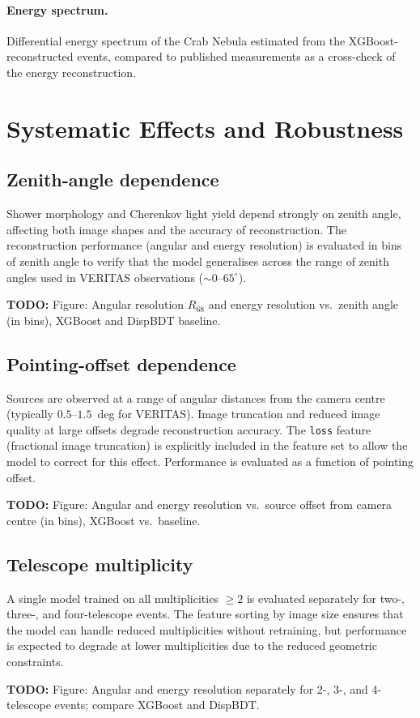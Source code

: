 \documentclass[12pt]{article}
\newcommand{\todo}[1]{\begin{hintBox} \textbf{TODO:} #1 \end{hintBox}}
\begin{document}
\paragraph{Energy spectrum.}
Differential energy spectrum of the Crab Nebula estimated from the
XGBoost-reconstructed events, compared to published measurements
\citep{2015ICRC...34..792A} as a cross-check of the energy reconstruction.

\section{Systematic Effects and Robustness}
\label{sec:systematics}

\subsection{Zenith-angle dependence}

Shower morphology and Cherenkov light yield depend strongly on zenith angle,
affecting both image shapes and the accuracy of reconstruction.
The reconstruction performance (angular and energy resolution) is evaluated
in bins of zenith angle to verify that the model generalises across the
range of zenith angles used in VERITAS observations ($\sim 0$--$65^\circ$).
\todo{Figure: Angular resolution $R_{68}$ and energy resolution vs.\ zenith angle (in bins), XGBoost and DispBDT baseline.}

\subsection{Pointing-offset dependence}

Sources are observed at a range of angular distances from the camera centre
(typically $0.5$--$1.5$~deg for VERITAS).
Image truncation and reduced image quality at large offsets degrade reconstruction
accuracy. The \texttt{loss} feature (fractional image truncation) is explicitly
included in the feature set to allow the model to correct for this effect.
Performance is evaluated as a function of pointing offset.
\todo{Figure: Angular and energy resolution vs.\ source offset from camera centre (in bins), XGBoost vs.\ baseline.}

\subsection{Telescope multiplicity}

A single model trained on all multiplicities $\geq 2$ is evaluated separately
for two-, three-, and four-telescope events.
The feature sorting by image size ensures that the model can handle reduced
multiplicities without retraining, but performance is expected to degrade
at lower multiplicities due to the reduced geometric constraints.
\todo{Figure: Angular and energy resolution separately for 2-, 3-, and 4-telescope events; compare XGBoost and DispBDT.}
\end{document}
